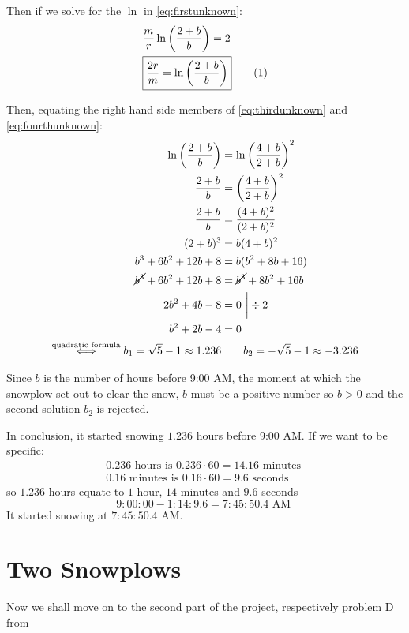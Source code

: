 \documentclass[a4paper,12pt]{article}
\renewcommand*{\textnormal}[1]{\text{ #1 }}
\newcommand\numberthis{\addtocounter{equation}{1}\tag{\theequation}}
\begin{document}
    Then if we solve for the $\ln$ in \eqref{eq:firstunknown}:
    \begin{align*}
        &\frac{m}{r} \ln\left(\frac{2+b}{b}\right) = 2 \\
        &\boxed{\frac{2r}{m} = \ln\left(\frac{2+b}{b}\right)} \numberthis \label{eq:fourthunknown}
    \end{align*}

    Then, equating the right hand side members of \eqref{eq:thirdunknown} and \eqref{eq:fourthunknown}:
    \begin{align*}
        \ln\left(\frac{2+b}{b}\right) &= \ln\left(\frac{4+b}{2+b}\right)^2 \\
        \frac{2+b}{b} &= \left(\frac{4+b}{2+b}\right)^2 \\
        \frac{2+b}{b} &= \frac{(4+b)^2}{(2+b)^2} \\
        (2+b)^3 &= b(4+b)^2 \\
        b^3 + 6b^2 + 12b + 8 &= b (b^2 + 8b + 16) \\
        \cancel{b^3} + 6b^2 + 12b + 8 &= \cancel{b^3} + 8b^2 + 16b \\
         2b^2 +  4b - 8 &= 0 \ \bigg| \div 2 \\ 
         b^2 + 2b - 4 &= 0 \\
         \overset{\text{quadratic formula}}{\iff} b_1 = \sqrt{5} - 1 \approx 1.236 &\qquad b_2 = -\sqrt 5 - 1 \approx - 3.236
    \end{align*}

    Since $b$ is the number of hours before 9:00 AM, the moment at which the snowplow set out to clear the snow, $b$ must be a positive number so $b >0$ and the second solution $b_2$ is rejected.

    In conclusion, it started snowing $1.236$ hours before 9:00 AM. If we want to be specific:
    \begin{align*}
        0.236 \textnormal{hours is} 0.236 \cdot 60 = 14.16 \textnormal{minutes} \\
        0.16 \textnormal{minutes is} 0.16 \cdot 60 = 9.6 \textnormal{seconds}
    \end{align*}
    so $1.236$ hours equate to $1$ hour, $14$ minutes and $9.6$ seconds
    \[
        9{:}00{:}00 - 1{:}14{:}9.6 = 7{:}45{:}50.4 \textnormal{AM}
    \]
   It started snowing at $7{:}45{:}50.4$ AM.

\part{Two Snowplows}
Now we shall move on to the second part of the project, respectively problem D from \cite[pp.~84--85]{Kent_Nagle2018-ig}
\end{document}
